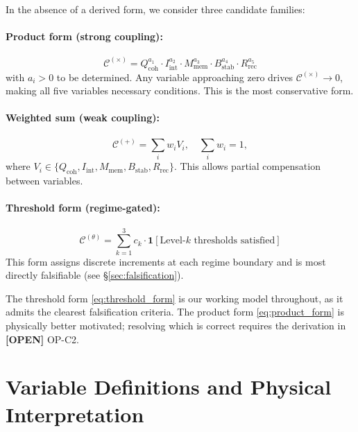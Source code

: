 \documentclass[12pt,letterpaper]{article}
\newcommand{\OPEN}[1]{\textcolor{red!70!black}{\textbf{[OPEN]}} #1}
\newcommand{\Cfunc}{\mathcal{C}}
\newcommand{\Qcoh}{Q_{\mathrm{coh}}}
\newcommand{\Iint}{I_{\mathrm{int}}}
\newcommand{\Mmem}{M_{\mathrm{mem}}}
\newcommand{\Bstab}{B_{\mathrm{stab}}}
\newcommand{\Rrec}{R_{\mathrm{rec}}}
\begin{document}
In the absence of a derived form, we consider three candidate families:

\paragraph{Product form (strong coupling):}
\begin{equation}
  \Cfunc^{(\times)} = \Qcoh^{a_1} \cdot \Iint^{a_2} \cdot \Mmem^{a_3}
    \cdot \Bstab^{a_4} \cdot \Rrec^{a_5}
  \label{eq:product_form}
\end{equation}
with $a_i > 0$ to be determined. Any variable approaching zero drives
$\Cfunc^{(\times)} \to 0$, making all five variables necessary conditions.
This is the most conservative form.

\paragraph{Weighted sum (weak coupling):}
\begin{equation}
  \Cfunc^{(+)} = \sum_{i} w_i V_i,
  \quad \sum_i w_i = 1,
  \label{eq:sum_form}
\end{equation}
where $V_i \in \{\Qcoh, \Iint, \Mmem, \Bstab, \Rrec\}$. This allows partial
compensation between variables.

\paragraph{Threshold form (regime-gated):}
\begin{equation}
  \Cfunc^{(\theta)} = \sum_{k=1}^{3} c_k \cdot
    \mathbf{1}\!\left[\text{Level-}k\text{ thresholds satisfied}\right]
  \label{eq:threshold_form}
\end{equation}
This form assigns discrete increments at each regime boundary and is most
directly falsifiable (see \S\ref{sec:falsification}).

\noindent The threshold form \eqref{eq:threshold_form} is our working model
throughout, as it admits the clearest falsification criteria. The product form
\eqref{eq:product_form} is physically better motivated; resolving which is
correct requires the derivation in \OPEN{OP-C2}.

\section{Variable Definitions and Physical Interpretation}
\label{sec:variables}
\end{document}
